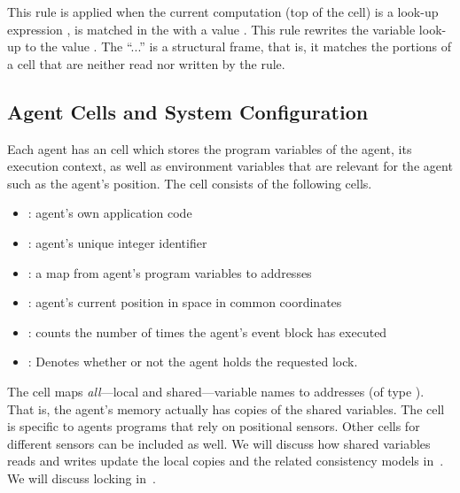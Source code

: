 This rule is applied when the current computation (top of the  cell) is a look-up expression ,  is matched in the  with a value .
This rule rewrites the variable look-up  to the value .
The ``...'' is a structural frame, that is, it matches the portions of a cell that are neither read nor written by the rule.
 
 


\subsection{Agent Cells and System Configuration}
%
Each agent has an  cell which stores the program variables of the agent, its execution context, as well as environment variables that are relevant for the agent such as the agent's position.  The  cell consists of the following cells.
%
\begin{itemize}
 \item  {}: agent's own application code
 \item {}: agent's unique integer identifier 
 \item {}: a map from agent's program variables to addresses
 \item  {}: agent's current position in space in common coordinates 
 \item  {}: counts the number of times the agent's event block has executed
 \item {}: Denotes whether or not the agent holds the requested lock.
\end{itemize}

%
The  cell maps  \emph{all}---local and shared---variable names to addresses (of type ). That is,  the agent's memory actually has copies of the shared variables.
The  cell is specific to agents programs that rely on positional sensors. Other cells for different sensors can be included as well. 
We will discuss how shared variables reads and writes update the local copies and the related consistency models in~. 
We will discuss locking in~. 

